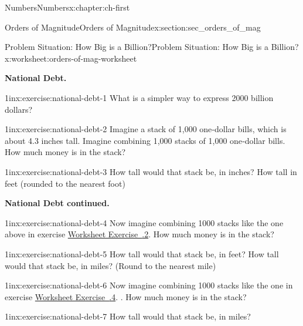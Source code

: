 \documentclass[twoside,10pt,]{book}
\newcommand{\xreffont}{\relax}
\numberwithin{equation}{chapter}
\begin{document}
\begin{chapterptx}{Numbers}{}{Numbers}{}{}{x:chapter:ch-first}
\begin{sectionptx}{Orders of Magnitude}{}{Orders of Magnitude}{}{}{x:section:sec_orders_of_mag}
\begin{worksheet-subsection-numberless}{Problem Situation: How Big is a Billion?}{}{Problem Situation: How Big is a Billion?}{}{}{x:worksheet:orders-of-mag-worksheet}
\par\medskip\noindent%
\textbf{National Debt.}\space\space%
\begin{exercisegroup}
\begin{divisionexerciseeg}{1}{}{1in}{x:exercise:national-debt-1}%
What is a simpler way to express 2000 billion dollars?\end{divisionexerciseeg}%
\begin{divisionexerciseeg}{2}{}{1in}{x:exercise:national-debt-2}%
Imagine a stack of 1,000 one‐dollar bills, which is about 4.3 inches tall. Imagine combining 1,000 stacks of 1,000 one‐dollar bills. How much money is in the stack?\end{divisionexerciseeg}%
\begin{divisionexerciseeg}{3}{}{1in}{x:exercise:national-debt-3}%
How tall would that stack be, in inches?  How tall in feet (rounded to the nearest foot)\end{divisionexerciseeg}%
\end{exercisegroup}
\par\medskip\noindent
\clearpage
\par\medskip\noindent%
\textbf{National Debt continued.}\space\space%
\begin{exercisegroup}
\begin{divisionexerciseeg}{4}{}{1in}{x:exercise:national-debt-4}%
Now imagine combining 1000 stacks like the one above in exercise \hyperlink{x:exercise:national-debt-2}{Worksheet Exercise~{\xreffont 1.2.2}}. How much money is in the stack?\end{divisionexerciseeg}%
\begin{divisionexerciseeg}{5}{}{1in}{x:exercise:national-debt-5}%
How tall would that stack be, in feet? How tall would that stack be, in miles? (Round to the nearest mile)\end{divisionexerciseeg}%
\begin{divisionexerciseeg}{6}{}{1in}{x:exercise:national-debt-6}%
Now imagine combining 1000 stacks like the one in exercise \hyperlink{x:exercise:national-debt-4}{Worksheet Exercise~{\xreffont 1.2.4}}. . How much money is in the stack?\end{divisionexerciseeg}%
\begin{divisionexerciseeg}{7}{}{1in}{x:exercise:national-debt-7}%
How tall would that stack be, in miles?\end{divisionexerciseeg}%
\end{exercisegroup}
\par\medskip\noindent
\clearpage
\par\medskip\noindent%

\end{worksheet-subsection-numberless}
\end{sectionptx}
\end{chapterptx}
\end{document}
